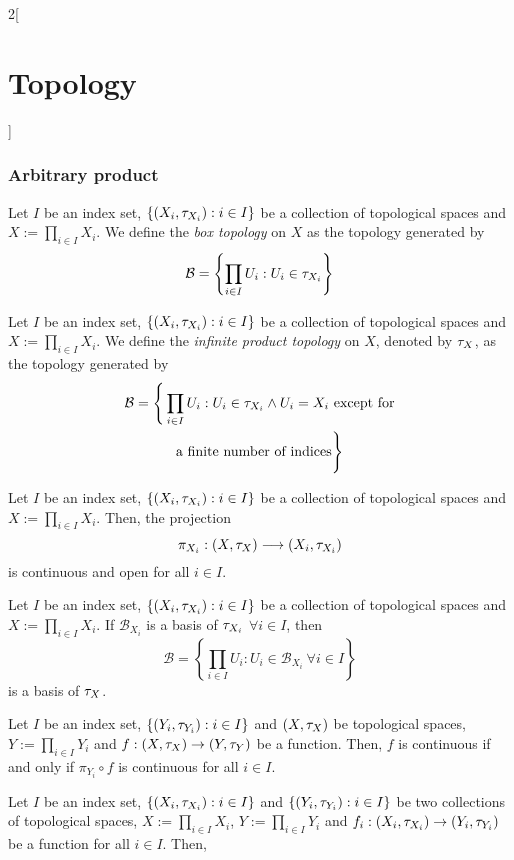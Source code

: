 \documentclass[../../../main.tex]{subfiles}
\begin{document}
\begin{multicols}{2}[\section{Topology}]
  \subsubsection{Arbitrary product}
  \begin{definition}
    Let $I$ be an index set, $\{(X_i,\tau_{X_i}):i\in I\}$ be a collection of topological spaces and $X:=\prod_{i\in I}X_i$. We define the \emph{box topology} on $X$ as the topology generated by $$\mathcal{B}=\left\{\prod_{i\in I}U_i:U_i\in\tau_{X_i}\right\}$$
  \end{definition}
  \begin{definition}
    Let $I$ be an index set, $\{(X_i,\tau_{X_i}):i\in I\}$ be a collection of topological spaces and $X:=\prod_{i\in I}X_i$. We define the \emph{infinite product topology} on $X$, denoted by $\tau_X$, as the topology generated by
    \begin{multline*}
      \mathcal{B}=\Bigg\{\prod_{i\in I}U_i:U_i\in\tau_{X_i}\land U_i=X_i\text{ except for}\\\text{a finite number of indices}\Bigg\}
    \end{multline*}
  \end{definition}
  \begin{prop}
    Let $I$ be an index set, $\{(X_i,\tau_{X_i}):i\in I\}$ be a collection of topological spaces and $X:=\prod_{i\in I}X_i$. Then, the projection $$\pi_{X_i}:\left(X,\tau_X\right)\longrightarrow (X_i,\tau_{X_i})$$
    is continuous and open for all $i\in I$.
  \end{prop}
  \begin{prop}
    Let $I$ be an index set, $\{(X_i,\tau_{X_i}):i\in I\}$ be a collection of topological spaces and $X:=\prod_{i\in I}X_i$. If $\mathcal{B}_{X_i}$ is a basis of $\tau_{X_i}$ $\forall i\in I$, then $$\mathcal{B}=\left\{\prod_{i\in I}U_i:U_i\in\mathcal{B}_{X_i}\ \forall i\in I\right\}$$
    is a basis of $\tau_X$.
  \end{prop}
  \begin{prop}
    Let $I$ be an index set, $\{(Y_i,\tau_{Y_i}):i\in I\}$ and $(X,\tau_X)$ be topological spaces, $Y:=\prod_{i\in I}Y_i$ and $f:(X,\tau_X)\rightarrow(Y,\tau_Y)$ be a function. Then, $f$ is continuous if and only if $\pi_{Y_i}\circ f$ is continuous for all $i\in I$.
  \end{prop}
  \begin{prop}
    Let $I$ be an index set, $\{(X_i,\tau_{X_i}):i\in I\}$ and $\{(Y_i,\tau_{Y_i}):i\in I\}$ be two collections of topological spaces, $X:=\prod_{i\in I}X_i$, $Y:=\prod_{i\in I}Y_i$ and $f_i:(X_i,\tau_{X_i})\rightarrow(Y_i,\tau_{Y_i})$ be a function for all $i\in I$. Then,

\end{prop}
\end{multicols}
\end{document}
